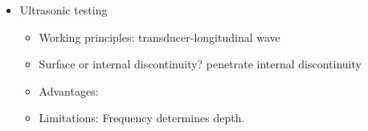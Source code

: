 \documentclass[11pt]{article}
\begin{document}
\begin{itemize}
\begin{itemize}
        \item Surface or internal discontinuity?
        \item Advantages:
        \item Limitations: 
    \end{itemize}
    \item Ultrasonic testing
    \begin{itemize}
        \item Working principles: transducer-longitudinal wave
        \item Surface or internal discontinuity? penetrate internal discontinuity
        \item Advantages:
        \item Limitations: Frequency determines depth. 
    \end{itemize}
\end{itemize}
\end{document}
